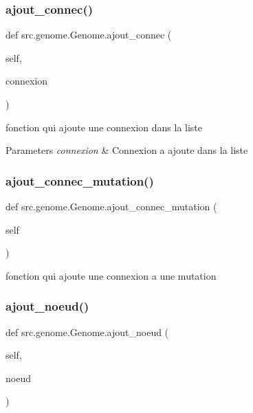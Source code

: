 \subsubsection{\texorpdfstring{ajout\+\_\+connec()}{ajout\_connec()}}
{\footnotesize\ttfamily def src.\+genome.\+Genome.\+ajout\+\_\+connec (\begin{DoxyParamCaption}\item[{}]{self,  }\item[{}]{connexion }\end{DoxyParamCaption})}



fonction qui ajoute une connexion dans la liste 


\begin{DoxyParams}{Parameters}
{\em connexion} & Connexion a ajoute dans la liste \\
\hline
\end{DoxyParams}
\mbox{\label{classsrc_1_1genome_1_1_genome_abbf59b4f5f026ede35169b71424f50de}} 
\subsubsection{\texorpdfstring{ajout\+\_\+connec\+\_\+mutation()}{ajout\_connec\_mutation()}}
{\footnotesize\ttfamily def src.\+genome.\+Genome.\+ajout\+\_\+connec\+\_\+mutation (\begin{DoxyParamCaption}\item[{}]{self }\end{DoxyParamCaption})}



fonction qui ajoute une connexion a une mutation 

\mbox{\label{classsrc_1_1genome_1_1_genome_a9a2f1ed5bfdea103e70042df7c2ee193}} 
\subsubsection{\texorpdfstring{ajout\+\_\+noeud()}{ajout\_noeud()}}
{\footnotesize\ttfamily def src.\+genome.\+Genome.\+ajout\+\_\+noeud (\begin{DoxyParamCaption}\item[{}]{self,  }\item[{}]{noeud }\end{DoxyParamCaption})}



